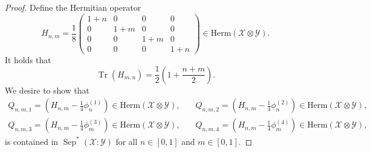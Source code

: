 \documentclass[11pt]{article}
\theoremstyle{definition}
\newcommand{\tr}{\operatorname{Tr}}
\newcommand{\sep}{\operatorname{Sep}}
\newcommand{\setft}[1]{\mathrm{#1}}
\newcommand{\Herm}{\setft{Herm}}
\newcommand{\X}{\mathcal{X}}
\newcommand{\Y}{\mathcal{Y}}
\begin{document}
\begin{proof}
	Define the Hermitian operator
	\begin{equation}
        H_{n, m} = \frac{1}{8}
        \begin{pmatrix}
            1+n & 0 & 0 & 0 \\
            0 & 1+m & 0 & 0 \\
            0 & 0 & 1+m & 0 \\
            0 & 0 & 0 & 1+n
        \end{pmatrix} \in \Herm(\X \otimes \Y).
	\end{equation}
	It holds that
	\begin{equation}
        \tr(H_{m,n}) = \frac{1}{2} \left(1 + \frac{n+m}{2}\right).
	\end{equation}
	We desire to show that
	\begin{equation}
        \begin{aligned}
            Q_{n, m, 1} = \left( H_{n,m} - \frac{1}{4} \phi_n^{(1)} \right) \in
            \Herm(\X \otimes \Y), &\quad
            Q_{n, m, 2} = \left( H_{n,m} - \frac{1}{4} \phi_n^{(2)} \right) \in
            \Herm(\X \otimes \Y), \\
            Q_{n, m, 3} = \left( H_{n,m} - \frac{1}{4} \phi_m^{(3)} \right) \in
            \Herm(\X \otimes \Y), &\quad
            Q_{n, m, 4} = \left( H_{n,m} - \frac{1}{4} \phi_m^{(4)} \right) \in
            \Herm(\X \otimes \Y),
        \end{aligned}
	\end{equation}
    is contained in $\sep^*(\X : \Y)$ for all $n \in [0, 1]$ and $m \in [0,
    1]$.
	

\end{proof}
\end{document}
